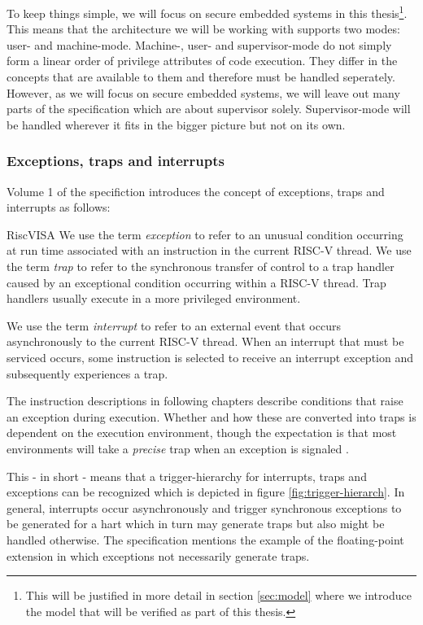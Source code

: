 To keep things simple, we will focus on secure embedded systems in this thesis\footnote{%
    This will be justified in more detail in section \ref{sec:model} where we introduce the model that will be verified as part of this thesis.
}.
This means that the architecture we will be working with supports two modes: user- and machine-mode.
Machine-, user- and supervisor-mode do not simply form a linear order of privilege attributes of code execution.
They differ in the concepts that are available to them and therefore must be handled seperately.
However, as we will focus on secure embedded systems, we will leave out many parts of the specification which are about supervisor solely.
Supervisor-mode will be handled wherever it fits in the bigger picture but not on its own.

\subsubsection{Exceptions, traps and interrupts}

Volume 1 of the specifiction introduces the concept of exceptions, traps and interrupts as follows:
\begin{displaycquote}{RiscVISA}
    We use the term \textit{exception} to refer to an unusual condition occurring at run time associated with an instruction in the current RISC-V thread.
    We use the term \textit{trap} to refer to the synchronous transfer of control to a trap handler caused by an exceptional condition occurring within a RISC-V thread.
    Trap handlers usually execute in a more privileged environment.

    We use the term \textit{interrupt} to refer to an external event that occurs asynchronously to the current RISC-V thread.
    When an interrupt that must be serviced occurs, some instruction is selected to receive an interrupt exception and subsequently experiences a trap.

    The instruction descriptions in following chapters describe conditions that raise an exception during execution.
    Whether and how these are converted into traps is dependent on the execution environment, though the expectation is that most environments will take a \textit{precise} trap when an exception is signaled \textelp{}.
\end{displaycquote}

This - in short - means that a trigger-hierarchy for interrupts, traps and exceptions can be recognized which is depicted in figure \ref{fig:trigger-hierarch}.
In general, interrupts occur asynchronously and trigger synchronous exceptions to be generated for a \gls{hart} which in turn may generate traps but also might be handled otherwise.
The specification mentions the example of the floating-point extension in which exceptions not necessarily generate traps.

